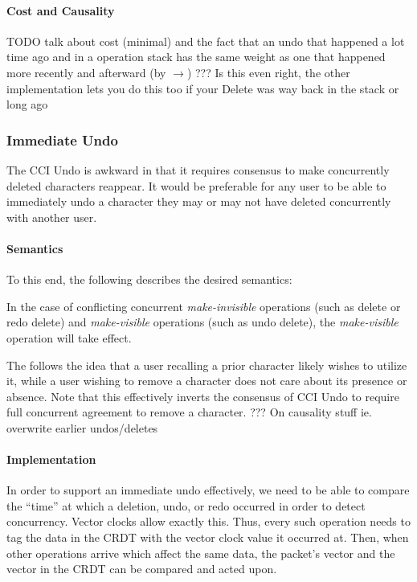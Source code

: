 \documentclass[12pt,a4paper,twoside,openright]{report}
\begin{document}
			\paragraph{Cost and Causality}
			TODO
			talk about cost (minimal) and the fact that an undo that happened a lot time ago and in a operation stack has the same weight as one that happened more recently and afterward (by $\rightarrow$) ??? Is this even right, the other implementation lets you do this too if your Delete was way back in the stack or long ago
			
		\subsubsection{Immediate Undo}
		The CCI Undo is awkward in that it requires consensus to make concurrently deleted characters reappear. It would be preferable for any user to be able to immediately undo a character they may or may not have deleted concurrently with another user.
		
			\paragraph{Semantics}
			To this end, the following describes the desired semantics:
			
			In the case of conflicting concurrent \textit{make-invisible} operations (such as delete or redo delete) and \textit{make-visible} operations (such as undo delete), the \textit{make-visible} operation will take effect.
			
			The follows the idea that a user recalling a prior character likely wishes to utilize it, while a user wishing to remove a character does not care about its presence or absence. Note that this effectively inverts the consensus of CCI Undo to require full concurrent agreement to remove a character. ??? On causality stuff ie. overwrite earlier undos/deletes
			
			\paragraph{Implementation}
			In order to support an immediate undo effectively, we need to be able to compare the ``time'' at which a deletion, undo, or redo occurred in order to detect concurrency. Vector clocks allow exactly this. Thus, every such operation needs to tag the data in the CRDT with the vector clock value it occurred at. Then, when other operations arrive which affect the same data, the packet's vector and the vector in the CRDT can be compared and acted upon.
			
\end{document}
